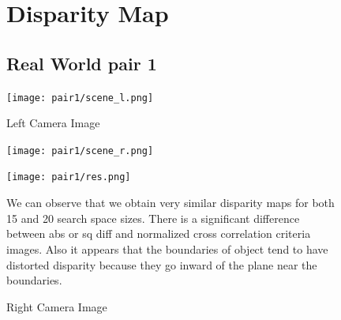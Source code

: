\documentclass[12pt]{article}
\begin{document}
	\pagebreak

  
		
    \begin{figure}[!htb]
      \section{Disparity Map}
    \subsection{Real World pair 1}
    \centering
    \begin{minipage}{.5\textwidth}
        \centering
        \texttt{[image: pair1/scene\_l.png]}
        \caption{Left Camera Image }
        \label{fig:1}
    \end{minipage}%
    \begin{minipage}{0.5\textwidth}
        \centering
        
        \texttt{[image: pair1/scene\_r.png]}
        \caption{Right Camera Image}
        \label{fig:2}
    \end{minipage}
    
      \texttt{[image: pair1/res.png]}
      
      We can observe that we obtain very similar disparity maps for both 15 and 20 search space sizes. There is a significant difference between abs or sq diff and normalized cross correlation criteria images. Also it appears that the boundaries of object tend to have distorted disparity because they go inward of the plane near the boundaries.
\end{figure}
  
\end{document}
